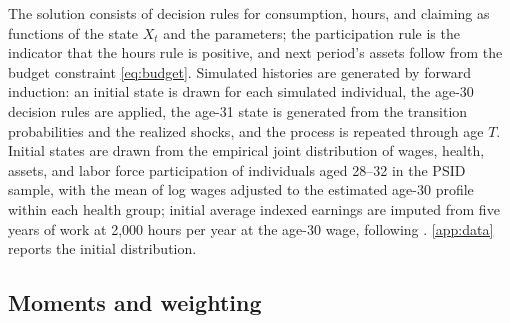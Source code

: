 The solution consists of decision rules for consumption, hours, and claiming as functions of the state $X_t$ and the parameters; the participation rule is the indicator that the hours rule is positive, and next period's assets follow from the budget constraint \eqref{eq:budget}. %
Simulated histories are generated by forward induction: an initial state is drawn for each simulated individual, the age-30 decision rules are applied, the age-31 state is generated from the transition probabilities and the realized shocks, and the process is repeated through age $T$. %
Initial states are drawn from the empirical joint distribution of wages, health, assets, and labor force participation of individuals aged 28--32 in the PSID sample, with the mean of log wages adjusted to the estimated age-30 profile within each health group; initial average indexed earnings are imputed from five years of work at 2,000 hours per year at the age-30 wage, following \citet{french2005effects}. %
\autoref{app:data} reports the initial distribution.

\subsection{Moments and weighting}\label{app:moments}


